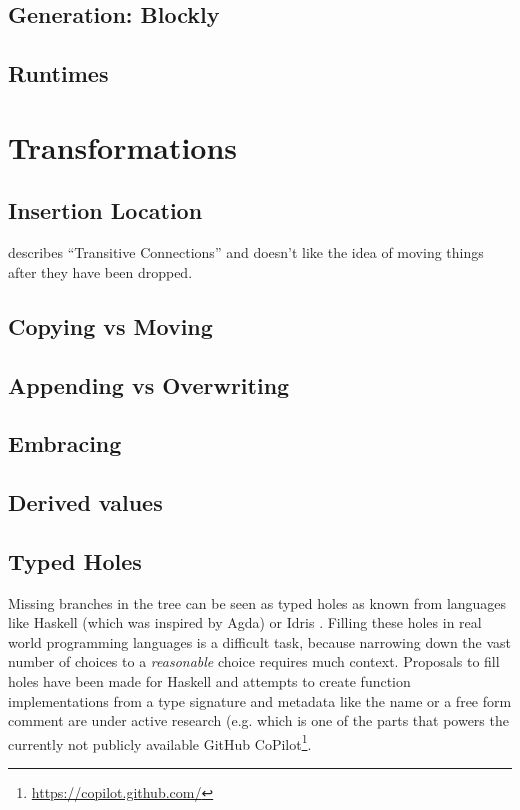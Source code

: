 \subsection{Generation: Blockly}

\subsection{Runtimes}

\section{Transformations}

\subsection{Insertion Location}

\cite{fraser_ten_2015} describes \enquote{Transitive Connections} and doesn't like the idea of moving things after they have been dropped.

\subsection{Copying vs Moving}

\subsection{Appending vs Overwriting}

\subsection{Embracing}

\subsection{Derived values}

\subsection{Typed Holes}

Missing branches in the tree can be seen as typed holes as known from languages like Haskell (which was inspired by Agda) \cite{jones_haskell_2014} or Idris \cite{brady_type-driven_2017}. Filling these holes in real world programming languages is a difficult task, because narrowing down the vast number of choices to a \textit{reasonable} choice requires much context. Proposals to fill holes have been made for Haskell \cite{gissurarson_suggesting_2018} and attempts to create function implementations from a type signature and metadata like the name or a free form comment are under active research (e.g. \cite{chen_evaluating_2021} which is one of the parts that powers the currently not publicly available GitHub CoPilot\footnote{\url{https://copilot.github.com/}}.

